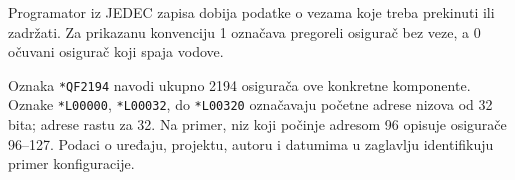 Programator iz JEDEC zapisa dobija podatke o vezama koje treba prekinuti ili zadržati. Za prikazanu konvenciju 1 označava pregoreli osigurač bez veze, a 0 očuvani osigurač koji spaja vodove.

Oznaka \texttt{*QF2194} navodi ukupno 2194 osigurača ove konkretne komponente. Oznake \texttt{*L00000}, \texttt{*L00032}, do \texttt{*L00320} označavaju početne adrese nizova od 32 bita; adrese rastu za 32. Na primer, niz koji počinje adresom 96 opisuje osigurače 96–127. Podaci o uređaju, projektu, autoru i datumima u zaglavlju identifikuju primer konfiguracije.
